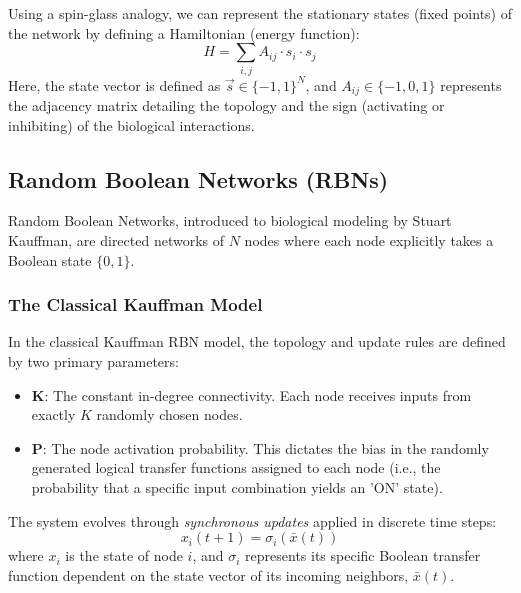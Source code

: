 Using a spin-glass analogy, we can represent the stationary states (fixed points) of the network by defining a Hamiltonian (energy function):
\[
    H = \sum_{i,j} A_{ij} \cdot s_i \cdot s_j
\]
Here, the state vector is defined as \(\vec{s} \in \{-1, 1\}^N\), and \(A_{ij} \in \{-1, 0, 1\}\) represents the adjacency matrix detailing the topology and the sign (activating or inhibiting) of the biological interactions.

\subsection{Random Boolean Networks (RBNs)}
\label{subsec:random_boolean_networks}

Random Boolean Networks, introduced to biological modeling by Stuart Kauffman, are directed networks of \(N\) nodes where each node explicitly takes a Boolean state \(\{0, 1\}\).


\subsubsection{The Classical Kauffman Model}
\label{subsubsec:kauffman_model}

In the classical Kauffman RBN model, the topology and update rules are defined by two primary parameters:
\begin{itemize}
    \item \(\mathbf{K}\): The constant in-degree connectivity. Each node receives inputs from exactly \(K\) randomly chosen nodes.
    \item \(\mathbf{P}\): The node activation probability. This dictates the bias in the randomly generated logical transfer functions assigned to each node (i.e., the probability that a specific input combination yields an 'ON' state).
\end{itemize}

The system evolves through \textit{synchronous updates} applied in discrete time steps:
\[
    x_i(t+1) = \sigma_i(\bar{x}(t))
\]
where \(x_i\) is the state of node \(i\), and \(\sigma_i\) represents its specific Boolean transfer function dependent on the state vector of its incoming neighbors, \(\bar{x}(t)\).

